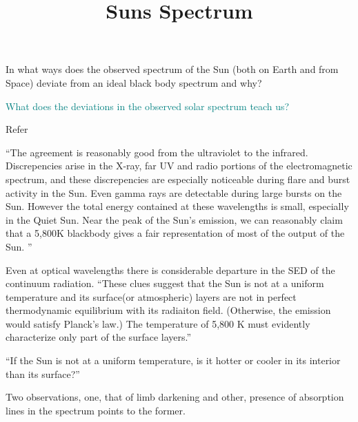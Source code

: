 \documentclass{../template/texnote}
\title{Suns Spectrum}
\begin{document}
    \maketitle {}
In what ways does the observed spectrum of the Sun (both on Earth and from Space) deviate from an ideal black body spectrum and why?

\textcolor{teal}{What does the deviations in the observed solar spectrum teach us?}

Refer 

``The agreement is reasonably good from the ultraviolet to the infrared. Discrepencies arise in the X-ray, far UV and radio portions of the electromagnetic spectrum, and these discrepencies are especially noticeable during flare and burst activity in the Sun.
Even gamma rays are detectable during large bursts on the Sun.
However the total energy contained at these wavelengths is small, especially in the Quiet Sun.
Near the peak of the Sun's emission, we can reasonably claim that a 5,800K blackbody gives a fair representation of most of the output of the Sun.
''

Even at  optical wavelengths there is considerable departure in the SED of the continuum radiation.
``These clues suggest that the Sun is not at a uniform  temperature and its surface(or atmospheric) layers are not in perfect thermodynamic equilibrium with its radiaiton field. (Otherwise, the emission would satisfy Planck's law.) The temperature of 5,800 K must evidently characterize only part of the surface layers.''

``If the Sun is not at a uniform temperature, is it hotter or cooler in its interior than its surface?''

Two observations, one, that of limb darkening and other, presence of absorption lines in the spectrum points to the former.

    \printbibliography
\end{document}
